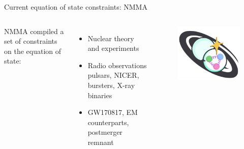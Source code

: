\documentclass[usenames,dvipsnames,t]{beamer}
\begin{document}
\begin{frame}{Current equation of state constraints: \textsc{NMMA}}

\def\x{2mm}
\def\y{2mm}
\def\z{-2mm}

\vspace{\z}

\begin{columns}

  \textsc{NMMA} compiled a set of constraints on the equation of state:
  \footnotesize
  \begin{itemize}

    \item Nuclear theory and experiments
    \item Radio observations pulsars, NICER, bursters, X-ray binaries
    \item GW170817, EM counterparts, postmerger remnant

  \end{itemize}
  \normalsize


  \begin{figure}[t]
    \centering
    \includegraphics[width=\linewidth]{Figures/NMMA logo.jpg}
  \end{figure}
  
\end{columns}


\end{frame}
\end{document}
